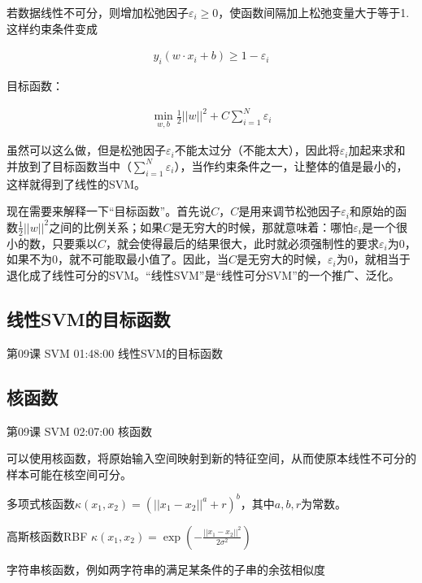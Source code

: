 \documentclass[UTF8]{ctexart}
\begin{document}
若数据线性不可分，则增加松弛因子$\varepsilon_{i} \geq 0$，使函数间隔加上松弛变量大于等于1.这样约束条件变成

\begin{equation}
\begin{aligned}
y_{i}(w \cdot x_{i}+b) \geq 1 - \varepsilon_{i}
\end{aligned}
\end{equation}

目标函数：

\begin{equation}
\begin{aligned}
\underset{w,b}{\min} \frac{1}{2} ||w||^{2} + C\sum_{i=1}^{N} \varepsilon_{i}
\end{aligned}
\end{equation}

虽然可以这么做，但是松弛因子$\varepsilon_{i}$不能太过分（不能太大），因此将$\varepsilon_{i}$加起来求和并放到了目标函数当中（$\sum_{i=1}^{N} \varepsilon_{i}$），当作约束条件之一，让整体的值是最小的，这样就得到了线性的SVM。

现在需要来解释一下“目标函数”。首先说$C$，$C$是用来调节松弛因子$\varepsilon_{i}$和原始的函数$\frac{1}{2} ||w||^{2}$之间的比例关系；如果$C$是无穷大的时候，那就意味着：哪怕$\varepsilon_{i}$是一个很小的数，只要乘以$C$，就会使得最后的结果很大，此时就必须强制性的要求$\varepsilon_{i}$为0，如果不为0，就不可能取最小值了。因此，当$C$是无穷大的时候，$\varepsilon_{i}$为0，就相当于退化成了线性可分的SVM。“线性SVM”是“线性可分SVM”的一个推广、泛化。

\subsection{线性SVM的目标函数}

第09课 SVM 01:48:00 线性SVM的目标函数

\subsection{核函数}

第09课 SVM 02:07:00 核函数

可以使用核函数，将原始输入空间映射到新的特征空间，从而使原本线性不可分的样本可能在核空间可分。

多项式核函数$\kappa(x_{1},x_{2})=(||x_{1}-x_{2}||^{a}+r)^{b}$，其中$a,b,r$为常数。

高斯核函数RBF $\kappa(x_{1},x_{2})=\exp \left ( -\frac{||x_{1}-x_{2}||^{2}}{2 \sigma^{2}}\right )$

字符串核函数，例如两字符串的满足某条件的子串的余弦相似度
\end{document}
